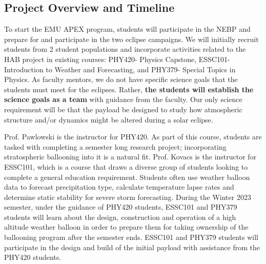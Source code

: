 \documentclass[12pt]{article}
\begin{document}
\subsection{Project Overview and Timeline}
To start the EMU APEX program, students will participate in the NEBP and prepare for
and participate in the two eclipse campaigns. We will initially recruit students from 2 student populations and incorporate
activities related to the HAB project in existing courses: PHY420- Physics
Capstone, ESSC101- Introduction to Weather and Forecasting, and PHY379- Special Topics in Physics.
As faculty mentors,
we do not have specific science goals that the students must meet for the eclipses. Rather,
{\bf the students will establish the science goals as a team }with guidance from the faculty.
Our only science requirement will be that the payload be designed to study how
atmospheric structure and/or dynamics might be altered during a solar eclipse.


Prof. Pawlowski is the instructor for PHY420. As part of this course, students are tasked with completing
a semester long research project; incorporating stratospheric ballooning into it is a
natural fit. Prof. Kovacs is the instructor for ESSC101, which is a course that draws a diverse group of students looking to complete a general education requirement. Students often use weather balloon data to forecast precipitation type, calculate temperature lapse rates and determine static stability for severe storm forecasting. During the Winter 2023 semester, under the guidance of PHY420 students,
 ESSC101 and PHY379 students will learn about the design, construction and operation
of a high altitude weather balloon in order to prepare them for taking ownership of the
ballooning program after the semester ends. ESSC101 and PHY379 students will
participate in the design and build of the initial payload with assistance from the PHY420 students.
\end{document}
